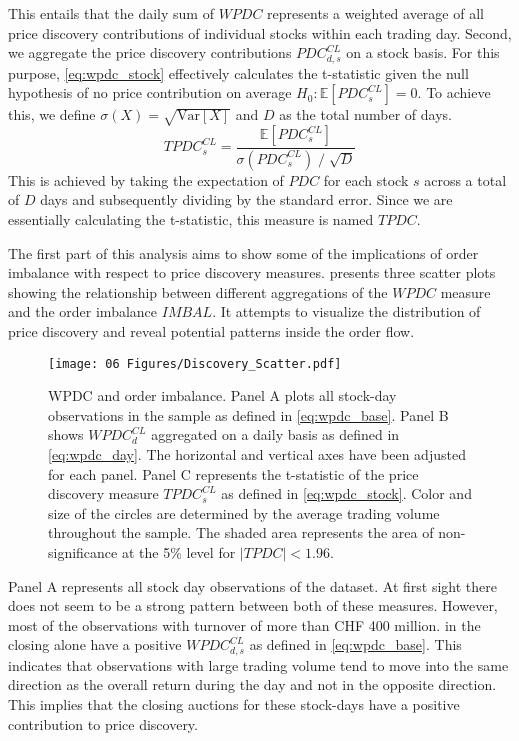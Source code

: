 \documentclass[11pt,a4paper, notitlepage]{article}
\begin{document}
	This entails that the daily sum of $WPDC$ represents a weighted average of all price discovery contributions of individual stocks within each trading day. Second, we aggregate the price discovery contributions $PDC^{CL}_{d,s}$ on a stock basis. For this purpose, \cref{eq:wpdc_stock} effectively calculates the t-statistic given the null hypothesis of no price contribution on average $H_0: \mathbb{E}\left[  PDC^{CL}_{s} \right] = 0$. To achieve this, we define $\sigma (X) = \sqrt{ \text{Var} \left[ X \right] }$ and $D$ as the total number of days.
	\begin{equation}
		\label{eq:wpdc_stock}
		TPDC^{CL}_{s} =  \frac{\mathbb{E} \left[  PDC^{CL}_{s} \right] }{ \sigma \left( PDC^{CL}_{s} \right) \; / \; \sqrt{D}}
	\end{equation}
	This is achieved by taking the expectation of $PDC$ for each stock $s$ across a total of $D$ days and subsequently dividing by the standard error.
	Since we are essentially calculating the t-statistic, this measure is named $TPDC$.
	
	
	The first part of this analysis aims to show some of the implications of order imbalance with respect to price discovery measures.  presents three scatter plots showing the relationship between different aggregations of the $WPDC$ measure and the order imbalance $IMBAL$. It attempts to visualize the distribution of price discovery and reveal potential patterns inside the order flow.
	
	\begin{figure}[htp]
		\centering
		\texttt{[image: 06 Figures/Discovery\_Scatter.pdf]}
		\caption{\ac{WPDC} and order imbalance. Panel A plots all stock-day observations in the sample as defined in \cref{eq:wpdc_base}. Panel B shows $WPDC^{CL}_d$ aggregated on a daily basis as defined in \cref{eq:wpdc_day}. The horizontal and vertical axes have been adjusted for each panel. Panel C represents the t-statistic of the price discovery measure $TPDC^{CL}_s$ as defined in \cref{eq:wpdc_stock}. Color and size of the circles are determined by the average trading volume throughout the sample. The shaded area represents the area of non-significance at the 5\% level for $| TPDC | < 1.96$. }
		\label{fig:Discovery}
	\end{figure}
	
	Panel A represents all stock day observations of the dataset. At first sight there does not seem to be a strong pattern between both of these measures. However, most of the observations with turnover of more than CHF 400 million. in the closing alone have a positive $WPDC^{CL}_{d,s}$ as defined in \cref{eq:wpdc_base}. This indicates that observations with large trading volume tend to move into the same direction as the overall return during the day and not in the opposite direction. This implies that the closing auctions for these stock-days have a positive contribution to price discovery.
	
\end{document}
